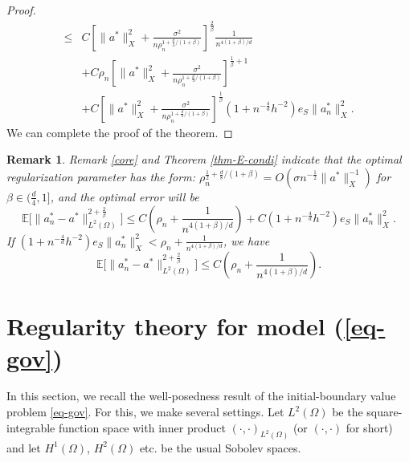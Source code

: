 \documentclass[11pt]{article}
\newtheorem{remark}{Remark}[section]
\numberwithin{equation}{section}
\begin{document}
\begin{proof}
\[\begin{aligned}
\le & C\left[ \| a^* \|^2_{X} + \frac{\sigma^2}{n \rho_n^{1 + \frac{d}4/(1+\beta)}}\right]^{\frac2\beta} \frac1{n^{4(1+\beta)/d}} \\
&+ C\rho_n\left[ \| a^* \|^2_{X} + \frac{\sigma^2}{n \rho_n^{1 + \frac{d}4/(1+\beta)}}\right]^{\frac1\beta+1}\\
&+C\left[ \| a^* \|^2_{X} + \frac{\sigma^2}{n \rho_n^{1 + \frac{d}4/(1+\beta)}}\right]^{\frac1\beta}\left(1+n^{-\frac4d}h^{-2}\right)e_S\|a_n^*\|^2_X.
\end{aligned}
\]
We can complete the proof of the theorem.
\end{proof}

\begin{remark}\label{remark-1}
Remark \ref{core} and Theorem \ref{thm-E-condi} indicate that the optimal regularization parameter has the form: $\rho_n^{\frac12 + \frac{d}8/(1+\beta)} = O(\sigma n^{-\frac12} \|a^*\|^{-1}_{X})$ for $\beta\in(\frac{d}{4},1]$, and the optimal error will be
\[
\mathbb{E} \bigl[ \| a_n^* - a^* \|^{2+\frac2\beta}_{L^2(\Omega)} \bigr]\le C \left(\rho_n+ \frac1{n^{4(1+\beta)/d}} \right)+C\left(1+n^{-\frac4d}h^{-2}\right)e_S\|a_n^*\|^2_X.
\]
If $\left(1+n^{-\frac4d}h^{-2}\right)e_S\|a_n^*\|^2_X<\rho_n+ \frac1{n^{4(1+\beta)/d}}$, we have
\[
\mathbb{E} \bigl[ \| a_n^* - a^* \|^{2+\frac2\beta}_{L^2(\Omega)} \bigr]\le C \left(\rho_n+ \frac1{n^{4(1+\beta)/d}} \right).
\]
\end{remark}

\section{Regularity theory for model (\ref{eq-gov})}\label{sec-reg}
In this section, we recall the well-posedness result of the initial-boundary value problem \eqref{eq-gov}. For this, we make several settings. Let $L^2(\Omega)$ be the square-integrable function space with inner product $(\cdot,\cdot)_{L^2(\Omega)}$ (or $(\cdot,\cdot)$ for short) and let $H^1(\Omega)$, $H^2(\Omega)$ etc. be the usual Sobolev spaces. 
\end{document}
